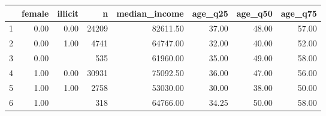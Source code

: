 \begin{table}[ht]
\centering
\begin{tabular}{rrrrrrrr}
  \hline
 & female & illicit & n & median\_income & age\_q25 & age\_q50 & age\_q75 \\ 
  \hline
1 & 0.00 & 0.00 & 24209 & 82611.50 & 37.00 & 48.00 & 57.00 \\ 
  2 & 0.00 & 1.00 & 4741 & 64747.00 & 32.00 & 40.00 & 52.00 \\ 
  3 & 0.00 &  & 535 & 61960.00 & 35.00 & 49.00 & 58.00 \\ 
  4 & 1.00 & 0.00 & 30931 & 75092.50 & 36.00 & 47.00 & 56.00 \\ 
  5 & 1.00 & 1.00 & 2758 & 53030.00 & 30.00 & 38.00 & 50.00 \\ 
  6 & 1.00 &  & 318 & 64766.00 & 34.25 & 50.00 & 58.00 \\ 
   \hline
\end{tabular}
\end{table}
